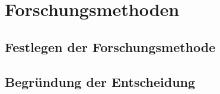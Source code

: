 \section{Forschungsmethoden}

\subsection{Festlegen der Forschungsmethode}
\lipsum[1-2]

\subsection{Begründung der Entscheidung}
\lipsum[1-2]